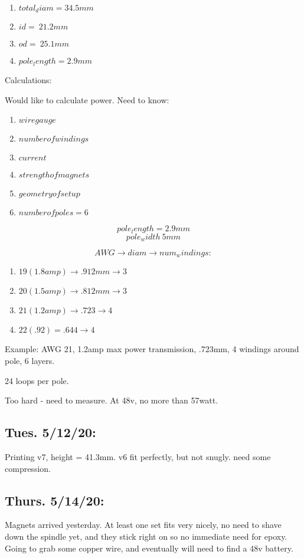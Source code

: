 \documentclass[11pt]{article} %
\begin{document}
\begin{enumerate}
\item $total_diam = 34.5mm$
\item $id = ~21.2mm$
\item $od =  ~25.1mm$
\item $pole_length = 2.9mm$
\end{enumerate}


Calculations:

Would like to calculate power. Need to know:

\begin{enumerate}
\item $wire gauge$
\item $number of windings$
\item $current$
\item $strength of magnets$
\item $geometry of setup$
\item $number of poles = 6$
\end{enumerate}

$$pole_length = 2.9mm$$
$$pole_width ~ 5mm$$

$$AWG \rightarrow diam \rightarrow num_windings:$$

\begin{enumerate}
\item $19 (1.8amp) \rightarrow .912mm \rightarrow 3$
\item $20 (1.5amp) \rightarrow .812mm \rightarrow 3$
\item $21 (1.2amp) \rightarrow .723 \rightarrow 4$
\item $22 (.92) = .644 \rightarrow 4$
\end{enumerate}

Example: AWG 21, 1.2amp max power transmission, .723mm, 4 windings around pole, 6 layers.

24 loops per pole.

Too hard - need to measure. At 48v, no more than 57watt.

\subsection{Tues. 5/12/20:} Printing v7, height = 41.3mm. v6 fit perfectly, but not snugly. need some compression.

\subsection{Thurs. 5/14/20:} Magnets arrived yesterday. At least one set fits very nicely, no need to shave down the spindle yet, and they stick right on so no immediate need for epoxy. Going to grab some copper wire, and eventually will need to find a 48v battery.
\end{document}
